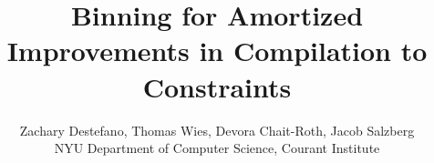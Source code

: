 \documentclass[letterpaper,10pt,twocolumn]{article}
\theoremstyle{definition}
\begin{document}
\title{Binning for Amortized Improvements in Compilation to Constraints}


\author{\rm{Zachary Destefano, Thomas Wies, Devora Chait-Roth, Jacob Salzberg} \vspace{.5pc}\\
\rm{NYU Department of Computer Science, Courant Institute}}

\date{}
\maketitle


% 
% 
% 
% 
% 
% 
% 
% 
% 

% 
\end{document}
